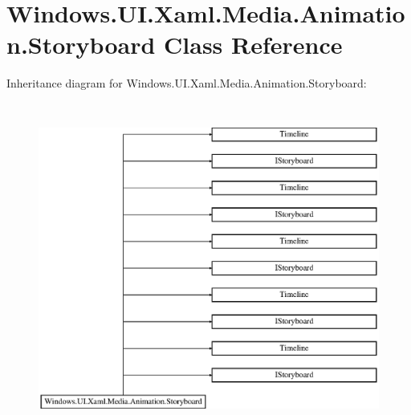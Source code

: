 \hypertarget{class_windows_1_1_u_i_1_1_xaml_1_1_media_1_1_animation_1_1_storyboard}{}\section{Windows.\+U\+I.\+Xaml.\+Media.\+Animation.\+Storyboard Class Reference}
\label{class_windows_1_1_u_i_1_1_xaml_1_1_media_1_1_animation_1_1_storyboard}
Inheritance diagram for Windows.\+U\+I.\+Xaml.\+Media.\+Animation.\+Storyboard\+:\begin{figure}[H]
\begin{center}
\leavevmode
\includegraphics[height=10.921986cm]{class_windows_1_1_u_i_1_1_xaml_1_1_media_1_1_animation_1_1_storyboard}
\end{center}
\end{figure}
